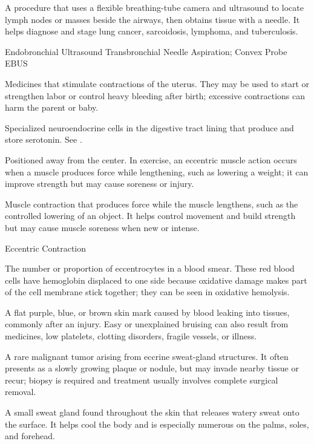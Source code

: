  A procedure that uses a flexible breathing-tube camera and ultrasound to locate lymph nodes or masses beside the airways, then obtains tissue with a needle. It helps diagnose and stage lung cancer, sarcoidosis, lymphoma, and tuberculosis.

\synonyms
Endobronchial Ultrasound Transbronchial Needle Aspiration; Convex Probe EBUS

 Medicines that stimulate contractions of the uterus. They may be used to start or strengthen labor or control heavy bleeding after birth; excessive contractions can harm the parent or baby.

 Specialized neuroendocrine cells in the digestive tract lining that produce and store serotonin. See .

 Positioned away from the center. In exercise, an eccentric muscle action occurs when a muscle produces force while lengthening, such as lowering a weight; it can improve strength but may cause soreness or injury.

 Muscle contraction that produces force while the muscle lengthens, such as the controlled lowering of an object. It helps control movement and build strength but may cause muscle soreness when new or intense.

\synonyms
Eccentric Contraction

 The number or proportion of eccentrocytes in a blood smear. These red blood cells have hemoglobin displaced to one side because oxidative damage makes part of the cell membrane stick together; they can be seen in oxidative hemolysis.

 A flat purple, blue, or brown skin mark caused by blood leaking into tissues, commonly after an injury. Easy or unexplained bruising can also result from medicines, low platelets, clotting disorders, fragile vessels, or illness.

 A rare malignant tumor arising from eccrine sweat-gland structures. It often presents as a slowly growing plaque or nodule, but may invade nearby tissue or recur; biopsy is required and treatment usually involves complete surgical removal.

 A small sweat gland found throughout the skin that releases watery sweat onto the surface. It helps cool the body and is especially numerous on the palms, soles, and forehead.

